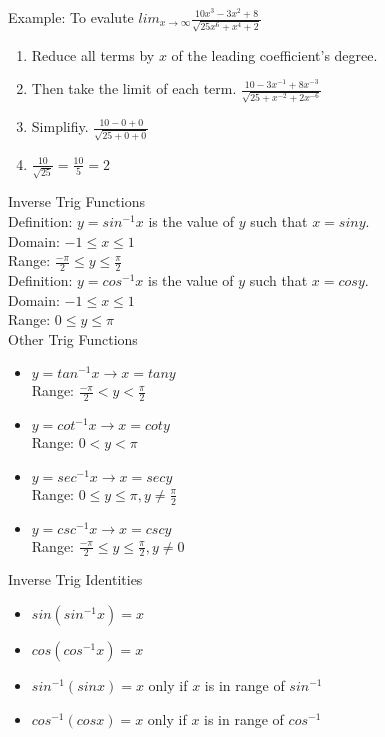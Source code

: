\documentclass{article}
\begin{document}
\noindent
Example: To evalute $lim_{x \to \infty}\frac{10x^3 - 3x^2 + 8}{\sqrt{25x^6 + x^4 + 2}}$
\begin{enumerate}
  \item {Reduce all terms by $x$ of the leading coefficient's degree.}
  \item {Then take the limit of each term. $\frac{10 - 3x^{-1} + 8x^{-3}}{\sqrt{25 + x^{-2} + 2x^{-6}}}$}
  \item {Simplifiy. $\frac{10 - 0 + 0}{\sqrt{25 + 0 + 0}}$}
  \item {$\frac{10}{\sqrt{25}} = \frac{10}{5} = 2$}
\end{enumerate}

\noindent
\Large Inverse Trig Functions\\
\normalsize
\noindent
Definition: $y = sin^{-1}x$ is the value of $y$ such that $x = siny$.\\
\indent
Domain: $-1 \leq x \leq 1$\\
\indent
Range: $\frac{-\pi}{2} \leq y \leq \frac{\pi}{2}$\\

\noindent
Definition: $y = cos^{-1}x$ is the value of $y$ such that $x = cosy$.\\
\indent
Domain: $-1 \leq x \leq 1$\\
\indent
Range: $0 \leq y \leq \pi$\\

\noindent
Other Trig Functions
\begin{itemize}
  \item {
  $y = tan^{-1}x \to x = tany$\\
  Range: $\frac{-\pi}{2} < y < \frac{\pi}{2}$
  }
  \item {
  $y = cot^{-1}x \to x = coty$\\
  Range: $0 < y < \pi$
  }
  \item {
  $y = sec^{-1}x \to x = secy$\\
  Range: $0 \leq y \leq \pi, y \neq\frac{\pi}{2}$
  }
  \item {
  $y = csc^{-1}x \to x = cscy$\\
  Range: $\frac{-\pi}{2} \leq y \leq \frac{\pi}{2}, y \neq 0$
  }
\end{itemize}

\noindent
\Large Inverse Trig Identities
\normalsize
\noindent
\begin{itemize}
  \item $sin(sin^{-1}x) = x$
  \item $cos(cos^{-1}x) = x$
  \item $sin^{-1}(sinx) = x$ only if $x$ is in range of $sin^{-1}$
  \item $cos^{-1}(cosx) = x$ only if $x$ is in range of $cos^{-1}$
\end{itemize}
\end{document}
